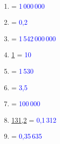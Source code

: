 \ \\ [-5mm]
   \begin{enumerate}
      \item {} = \textcolor{blue}{1\,000\,000} \ummc{}
      \item {} = \textcolor{blue}{0,2} \ucmc{}
      \item {} = \textcolor{blue}{1\,542\,000\,000} \udamc{}
      \item \ul{1} = \textcolor{blue}{10} \udl{}
      \item {} = \textcolor{blue}{1\,530} \ucl{}
      \item {} = \textcolor{blue}{3,5} \ul{}
      \item {} = \textcolor{blue}{100\,000} \ucmc{}
      \item \ul{131,2} = \textcolor{blue}{0,1\,312} \umc{}
      \item {} = \textcolor{blue}{0,35\,635} \udl{}
   \end{enumerate}
